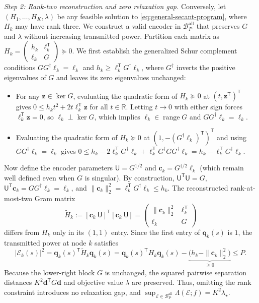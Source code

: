 \documentclass[journal,12pt,onecolumn,draftclsnofoot]{IEEEtran}
\newcommand{\enc}{\mathscr{E}}\newcommand{\dec}{\mathscr{D}}\newcommand{\R}{\mathbb R}\newcommand{\C}{\mathbb C}
\newcommand{\T}{\mathsf T}\newcommand{\suc}{\succeq}
\begin{document}
\emph{Step 2: Rank-two reconstruction and zero relaxation gap.}
Conversely, let $(H_1,\ldots,H_K,\lambda)$ be any feasible solution to \eqref{eq:general-secant-program}, where $H_k$ may have rank three. We construct a valid encoder in $\mathcal B_P^{\mathrm{all}}$ that preserves $G$ and $\lambda$ without increasing transmitted power.
Partition each matrix as $H_k=\left(\begin{smallmatrix}h_k&\boldsymbol\ell_k^\T\\
\boldsymbol\ell_k&G\end{smallmatrix}\right)\succeq0$.
We first establish the generalized Schur complement conditions $GG^\dagger\boldsymbol\ell_k=\boldsymbol\ell_k$ and $h_k\ge\boldsymbol\ell_k^\T G^\dagger\boldsymbol\ell_k$, where $G^\dagger$ inverts the positive eigenvalues of $G$ and leaves its zero eigenvalues unchanged:
\begin{itemize}
\item For any $\boldsymbol z\in\ker G$, evaluating the quadratic form of $H_k\succeq0$ at $(t,\boldsymbol z^\T)^\T$ gives $0\le h_kt^2+2t\boldsymbol\ell_k^\T\boldsymbol z$ for all $t\in\R$. Letting $t\to0$ with either sign forces $\boldsymbol\ell_k^\T\boldsymbol z=0$, so $\boldsymbol\ell_k\perp\ker G$, which implies $\boldsymbol\ell_k\in\operatorname{range}G$ and $GG^\dagger\boldsymbol\ell_k=\boldsymbol\ell_k$.
\item Evaluating the quadratic form of $H_k\succeq0$ at $(1,-(G^\dagger\boldsymbol\ell_k)^\T)^\T$ and using $GG^\dagger\boldsymbol\ell_k=\boldsymbol\ell_k$ gives $0\le h_k-2\boldsymbol\ell_k^\T G^\dagger\boldsymbol\ell_k+\boldsymbol\ell_k^\T G^\dagger GG^\dagger\boldsymbol\ell_k=h_k-\boldsymbol\ell_k^\T G^\dagger\boldsymbol\ell_k$.
\end{itemize}
Now define the encoder parameters $\mathsf U=G^{1/2}$ and $\boldsymbol c_k=G^{\dagger/2}\boldsymbol\ell_k$ (which remain well defined even when $G$ is singular). By construction, $\mathsf U^\T\mathsf U=G$, $\mathsf U^\T\boldsymbol c_k=GG^\dagger\boldsymbol\ell_k=\boldsymbol\ell_k$, and $\|\boldsymbol c_k\|_2^2=\boldsymbol\ell_k^\T G^\dagger\boldsymbol\ell_k\le h_k$.
The reconstructed rank-at-most-two Gram matrix
$$
\widetilde H_k:=[\boldsymbol c_k\ \mathsf U]^\T[\boldsymbol c_k\ \mathsf U]
=\begin{pmatrix}\|\boldsymbol c_k\|_2^2&\boldsymbol\ell_k^\T\\\boldsymbol\ell_k&G\end{pmatrix}
$$
differs from $H_k$ only in its $(1,1)$ entry. Since the first entry of $\boldsymbol q_k(s)$ is $1$, the transmitted power at node $k$ satisfies
$$
|\enc_k(s)|^2=\boldsymbol q_k(s)^\T\widetilde H_k\boldsymbol q_k(s)
=\boldsymbol q_k(s)^\T H_k\boldsymbol q_k(s)
-\underbrace{\bigl(h_k-\|\boldsymbol c_k\|_2^2\bigr)}_{\ge0}\le P.
$$
Because the lower-right block $G$ is unchanged, the squared pairwise separation distances $K^2\boldsymbol d^\T G\boldsymbol d$ and objective value $\lambda$ are preserved. Thus, omitting the rank constraint introduces no relaxation gap, and $\sup_{\enc\in\mathcal B_P^{\mathrm{all}}}\Lambda(\enc;f)=K^2\lambda_\star$.
\end{document}
